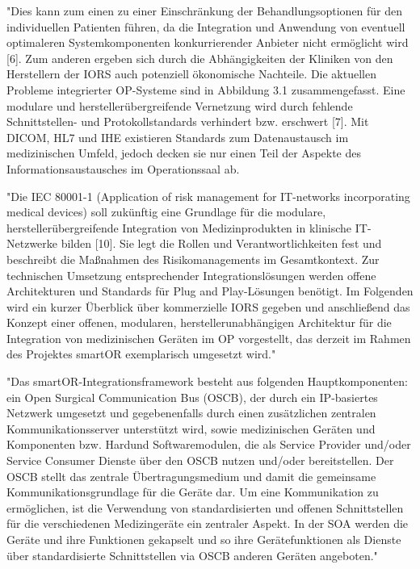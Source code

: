 	"Dies kann zum einen zu einer Einschränkung der Behandlungsoptionen für den
	individuellen Patienten führen, da die Integration und Anwendung von eventuell
	optimaleren Systemkomponenten konkurrierender Anbieter nicht ermöglicht wird
	[6]. Zum anderen ergeben sich durch die Abhängigkeiten der Kliniken von den Herstellern
	der IORS auch potenziell ökonomische Nachteile. Die aktuellen Probleme
	integrierter OP-Systeme sind in Abbildung 3.1 zusammengefasst.
	Eine modulare und herstellerübergreifende Vernetzung wird durch fehlende
	Schnittstellen- und Protokollstandards verhindert bzw. erschwert [7]. Mit DICOM, HL7
	und IHE existieren Standards zum Datenaustausch im medizinischen Umfeld, jedoch
	decken sie nur einen Teil der Aspekte des Informationsaustausches im Operationssaal
	ab.
	
	"Die IEC 80001-1 (Application of risk management for IT-networks incorporating
	medical devices) soll zukünftig eine Grundlage für die modulare, herstellerübergreifende
	Integration von Medizinprodukten in klinische IT-Netzwerke bilden [10]. Sie
	legt die Rollen und Verantwortlichkeiten fest und beschreibt die Maßnahmen des
	Risikomanagements im Gesamtkontext.
	Zur technischen Umsetzung entsprechender Integrationslösungen werden offene
	Architekturen und Standards für Plug and Play-Lösungen benötigt. Im Folgenden wird
	ein kurzer Überblick über kommerzielle IORS gegeben und anschließend das Konzept
	einer offenen, modularen, herstellerunabhängigen Architektur für die Integration
	von medizinischen Geräten im OP vorgestellt, das derzeit im Rahmen des Projektes
	smartOR exemplarisch umgesetzt wird."
	
	"Das smartOR-Integrationsframework besteht aus folgenden Hauptkomponenten:
	ein Open Surgical Communication Bus (OSCB), der durch ein IP-basiertes Netzwerk
	umgesetzt und gegebenenfalls durch einen zusätzlichen zentralen Kommunikationsserver
	unterstützt wird, sowie medizinischen Geräten und Komponenten bzw. Hardund
	Softwaremodulen, die als Service Provider und/oder Service Consumer Dienste
	über den OSCB nutzen und/oder bereitstellen.
	Der OSCB stellt das zentrale Übertragungsmedium und damit die gemeinsame
	Kommunikationsgrundlage für die Geräte dar. Um eine Kommunikation zu ermöglichen,
	ist die Verwendung von standardisierten und offenen Schnittstellen für die
	verschiedenen Medizingeräte ein zentraler Aspekt. In der SOA werden die Geräte und
	ihre Funktionen gekapselt und so ihre Gerätefunktionen als Dienste über standardisierte
	Schnittstellen via OSCB anderen Geräten angeboten."
	
